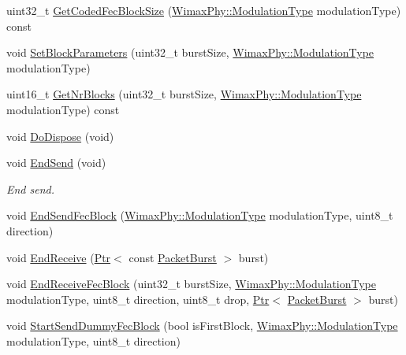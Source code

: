 \begin{DoxyCompactItemize}
uint32\+\_\+t \hyperlink{classns3_1_1SimpleOfdmWimaxPhy_a27bc44d6ec5ccadcc09ccae8e8e7add9}{Get\+Coded\+Fec\+Block\+Size} (\hyperlink{classns3_1_1WimaxPhy_a044c5d8a48ca992c39c2a946f6e755fa}{Wimax\+Phy\+::\+Modulation\+Type} modulation\+Type) const 
\item 
void \hyperlink{classns3_1_1SimpleOfdmWimaxPhy_a66efff7abf01eac223b568755d5291a9}{Set\+Block\+Parameters} (uint32\+\_\+t burst\+Size, \hyperlink{classns3_1_1WimaxPhy_a044c5d8a48ca992c39c2a946f6e755fa}{Wimax\+Phy\+::\+Modulation\+Type} modulation\+Type)
\item 
uint16\+\_\+t \hyperlink{classns3_1_1SimpleOfdmWimaxPhy_a956a6ed70b7c801b9fe98235bdeef3d2}{Get\+Nr\+Blocks} (uint32\+\_\+t burst\+Size, \hyperlink{classns3_1_1WimaxPhy_a044c5d8a48ca992c39c2a946f6e755fa}{Wimax\+Phy\+::\+Modulation\+Type} modulation\+Type) const 
\item 
void \hyperlink{classns3_1_1SimpleOfdmWimaxPhy_acb6c0798796e0067ae19de9972172dd5}{Do\+Dispose} (void)
\item 
void \hyperlink{classns3_1_1SimpleOfdmWimaxPhy_a2bc264f3724517b2926faa60a2234eef}{End\+Send} (void)
\begin{DoxyCompactList}\small\item\em End send. \end{DoxyCompactList}\item 
void \hyperlink{classns3_1_1SimpleOfdmWimaxPhy_a488d6fa3a7f48b641422e790c796a742}{End\+Send\+Fec\+Block} (\hyperlink{classns3_1_1WimaxPhy_a044c5d8a48ca992c39c2a946f6e755fa}{Wimax\+Phy\+::\+Modulation\+Type} modulation\+Type, uint8\+\_\+t direction)
\item 
void \hyperlink{classns3_1_1SimpleOfdmWimaxPhy_a17ca55242f086cdaacdbe55b571a8f37}{End\+Receive} (\hyperlink{classns3_1_1Ptr}{Ptr}$<$ const \hyperlink{classns3_1_1PacketBurst}{Packet\+Burst} $>$ burst)
\item 
void \hyperlink{classns3_1_1SimpleOfdmWimaxPhy_a5877b5cc70b95f8b2b3c4129a88ee4ed}{End\+Receive\+Fec\+Block} (uint32\+\_\+t burst\+Size, \hyperlink{classns3_1_1WimaxPhy_a044c5d8a48ca992c39c2a946f6e755fa}{Wimax\+Phy\+::\+Modulation\+Type} modulation\+Type, uint8\+\_\+t direction, uint8\+\_\+t drop, \hyperlink{classns3_1_1Ptr}{Ptr}$<$ \hyperlink{classns3_1_1PacketBurst}{Packet\+Burst} $>$ burst)
\item 
void \hyperlink{classns3_1_1SimpleOfdmWimaxPhy_a224ebae3cb0c6309b1d290dcfe349963}{Start\+Send\+Dummy\+Fec\+Block} (bool is\+First\+Block, \hyperlink{classns3_1_1WimaxPhy_a044c5d8a48ca992c39c2a946f6e755fa}{Wimax\+Phy\+::\+Modulation\+Type} modulation\+Type, uint8\+\_\+t direction)

\end{DoxyCompactItemize}
